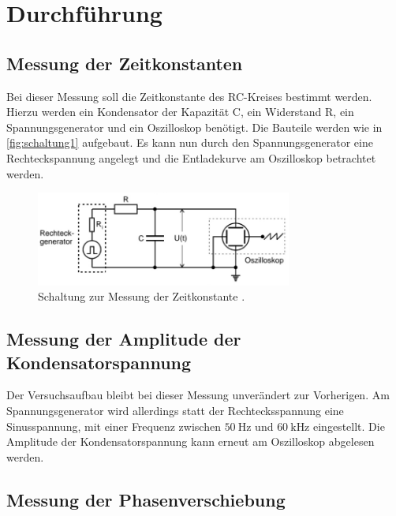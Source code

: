 \section{Durchführung}
\label{sec:Durchführung}


\subsection{Messung der Zeitkonstanten}

\sloppy
Bei dieser Messung soll die Zeitkonstante des RC-Kreises bestimmt werden. Hierzu werden ein Kondensator der Kapazität C, ein Widerstand R, 
ein Spannungsgenerator und ein Oszilloskop benötigt. Die Bauteile werden wie in \autoref{fig:schaltung1} aufgebaut. Es kann nun durch den 
Spannungsgenerator eine Rechteckspannung angelegt und die Entladekurve am Oszilloskop betrachtet werden.
\begin{figure}[H]
    \centering
    \includegraphics[width=0.75\textwidth]{Dateien/Schaltung1.jpg}
    \caption{Schaltung zur Messung der Zeitkonstante \cite{anleitung353}.}
    \label{fig:schaltung1}
\end{figure}


\subsection{Messung der Amplitude der Kondensatorspannung}
Der Versuchsaufbau bleibt bei dieser Messung unverändert zur Vorherigen. Am Spannungsgenerator wird allerdings statt der Rechtecksspannung 
eine Sinusspannung, mit einer Frequenz zwischen $\SI{50}{\hertz}$ und $\SI{60}{\kilo\hertz}$ eingestellt. Die Amplitude der 
Kondensatorspannung kann erneut am Oszilloskop abgelesen werden.


\subsection{Messung der Phasenverschiebung}

